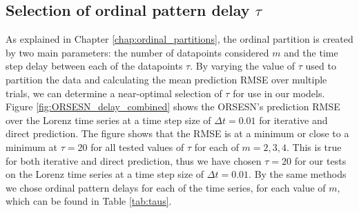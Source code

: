 \subsection{Selection of ordinal pattern delay $\tau$}

As explained in Chapter \ref{chap:ordinal_partitions}, the ordinal partition is created by two main parameters: the number of datapoints considered $m$ and the time step delay between each of the datapoints $\tau$. By varying the value of $\tau$ used to partition the data and calculating the mean prediction RMSE over multiple trials, we can determine a near-optimal selection of $\tau$ for use in our models. Figure \ref{fig:ORSESN_delay_combined} shows the ORSESN's prediction RMSE over the Lorenz time series at a time step size of $\Delta t = 0.01$ for iterative and direct prediction. The figure shows that the RMSE is at a minimum or close to a minimum at $\tau = 20$ for all tested values of $\tau$ for each of $m = 2,3,4$. This is true for both iterative and direct prediction, thus we have chosen $\tau=20$ for our tests on the Lorenz time series at a time step size of $\Delta t = 0.01$. By the same methods we chose ordinal pattern delays for each of the time series, for each value of $m$, which can be found in Table \ref{tab:taus}.



